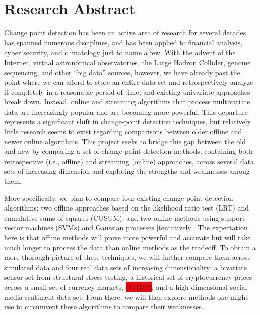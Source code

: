 \documentclass[10pt,letterpaper]{article}
\begin{document}
\maketitle

\section{Research Abstract}

Change point detection has been an active area of research for several decades, has spanned numerous disciplines, and has been applied to financial analysis, cyber security, and climatology just to name a few.
With the advent of the Internet, virtual astronomical observatories, the Large Hadron Collider, genome sequencing, and other ``big data'' sources, however, we have already past the point where we can afford to store an entire data set and retrospectively analyze it completely in a reasonable period of time, and existing univariate approaches break down.
Instead, online and streaming algorithms that process multivariate data are increasingly popular and are becoming more powerful.
This departure represents a significant shift in change-point detection techniques, but relatively little research seems to exist regarding comparisons between older offline and newer online algorithms.
This project seeks to bridge this gap between the old and new by comparing a set of change-point detection methods, containing both retrospective (i.e., offline) and streaming (online) approaches, across several data sets of increasing dimension and exploring the strengths and weaknesses among them.

More specifically, we plan to compare four existing change-point detection algorithms: two offline approaches based on the likelihood ratio test (LRT) and cumulative sums of squares (CUSUM), and two online methods using support vector machines (SVMs) and Gaussian processes [tentatively].
The expectation here is that offline methods will prove more powerful and accurate but will take much longer to process the data than online methods as the tradeoff.
To obtain a more thorough picture of these techniques, we will further compare them across simulated data and four real data sets of increasing dimensionality: a bivariate sensor set from structural stress testing, a historical set of cryptocurrency prices across a small set of currency markets, \colorbox{red}{OTHER}, and a high-dimensional social media sentiment data set.
From there, we will then explore methods one might use to circumvent these algorithms to compare their weaknesses.
\end{document}
